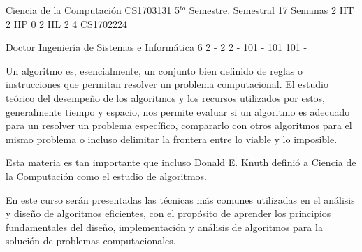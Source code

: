 \documentclass[a4paper,8pt]{article}
\begin{document}
\setNombreProfesor{}
\setGradoProfesorAbreviado{}
\sylabusHeader

\academicaTable
{Ciencia de la Computación} %
{CS1703131} %
{5$^{to}$ Semestre.} %
{Semestral} %
{17 Semanas} %
{2 HT} %
{2 HP} %
{0} %
{2 HL}  %
{2} %
{4} %
{CS1702224} %

\administrativaTable
{Doctor} %
{Ingeniería de Sistemas e Informática} %
{6} %
{2} %
{-} %
{2} %
{2} %
{-} %
{101} %
{-} %
{101} %
{101} %
{-} %


\begin{fundamentacion}
Un algoritmo es, esencialmente, un conjunto bien definido de reglas o instrucciones
que permitan resolver un problema computacional. El estudio teórico del desempeño
de los algoritmos y los recursos utilizados por estos, generalmente tiempo y espacio, 
nos permite evaluar si un algoritmo es adecuado para un resolver un problema 
específico, compararlo con otros algoritmos para el mismo problema o incluso
delimitar la frontera entre lo viable y lo imposible.

Esta materia es tan importante que incluso Donald E. Knuth definió a
Ciencia de la Computación como el estudio de algoritmos.

En este curso serán presentadas las técnicas más comunes utilizadas en el análisis y diseño de 
algoritmos eficientes, con el propósito de aprender los principios fundamentales
del diseño, implementación y análisis de algoritmos para la solución de problemas
computacionales.

\end{fundamentacion}

\begin{sumilla}
\item \ALBasicAnalysis
\item \ALAlgorithmicStrategies
\item \ALFundamentalDataStructuresandAlgorithms
\item \ALBasicAutomataComputabilityandComplexity
\item \ALAdvancedDataStructuresAlgorithmsandAnalysis

\end{sumilla}
\end{document}
